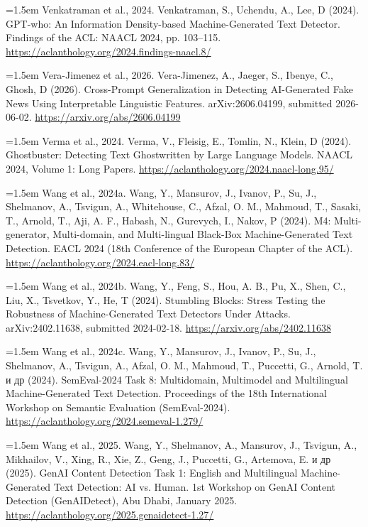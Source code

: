 \documentclass[11pt,a4paper]{article}
\renewcommand{\_}{\textunderscore\allowbreak}
\begin{document}
\noindent\hangindent=1.5em Venkatraman et al., 2024. Venkatraman, S., Uchendu, A., Lee, D (2024). GPT-who: An Information Density-based Machine-Generated Text Detector. Findings of the ACL: NAACL 2024, pp. 103–115. \url{https://aclanthology.org/2024.findings-naacl.8/}\par\smallskip

\noindent\hangindent=1.5em Vera-Jimenez et al., 2026. Vera-Jimenez, A., Jaeger, S., Ibenye, C., Ghosh, D (2026). Cross-Prompt Generalization in Detecting AI-Generated Fake News Using Interpretable Linguistic Features. arXiv:2606.04199, submitted 2026-06-02. \url{https://arxiv.org/abs/2606.04199}\par\smallskip

\noindent\hangindent=1.5em Verma et al., 2024. Verma, V., Fleisig, E., Tomlin, N., Klein, D (2024). Ghostbuster: Detecting Text Ghostwritten by Large Language Models. NAACL 2024, Volume 1: Long Papers. \url{https://aclanthology.org/2024.naacl-long.95/}\par\smallskip

\noindent\hangindent=1.5em Wang et al., 2024a. Wang, Y., Mansurov, J., Ivanov, P., Su, J., Shelmanov, A., Tsvigun, A., Whitehouse, C., Afzal, O. M., Mahmoud, T., Sasaki, T., Arnold, T., Aji, A. F., Habash, N., Gurevych, I., Nakov, P (2024). M4: Multi-generator, Multi-domain, and Multi-lingual Black-Box Machine-Generated Text Detection. EACL 2024 (18th Conference of the European Chapter of the ACL). \url{https://aclanthology.org/2024.eacl-long.83/}\par\smallskip

\noindent\hangindent=1.5em Wang et al., 2024b. Wang, Y., Feng, S., Hou, A. B., Pu, X., Shen, C., Liu, X., Tsvetkov, Y., He, T (2024). Stumbling Blocks: Stress Testing the Robustness of Machine-Generated Text Detectors Under Attacks. arXiv:2402.11638, submitted 2024-02-18. \url{https://arxiv.org/abs/2402.11638}\par\smallskip

\noindent\hangindent=1.5em Wang et al., 2024c. Wang, Y., Mansurov, J., Ivanov, P., Su, J., Shelmanov, A., Tsvigun, A., Afzal, O. M., Mahmoud, T., Puccetti, G., Arnold, T. и др (2024). SemEval-2024 Task 8: Multidomain, Multimodel and Multilingual Machine-Generated Text Detection. Proceedings of the 18th International Workshop on Semantic Evaluation (SemEval-2024). \url{https://aclanthology.org/2024.semeval-1.279/}\par\smallskip

\noindent\hangindent=1.5em Wang et al., 2025. Wang, Y., Shelmanov, A., Mansurov, J., Tsvigun, A., Mikhailov, V., Xing, R., Xie, Z., Geng, J., Puccetti, G., Artemova, E. и др (2025). GenAI Content Detection Task 1: English and Multilingual Machine-Generated Text Detection: AI vs. Human. 1st Workshop on GenAI Content Detection (GenAIDetect), Abu Dhabi, January 2025. \url{https://aclanthology.org/2025.genaidetect-1.27/}\par\smallskip
\end{document}
